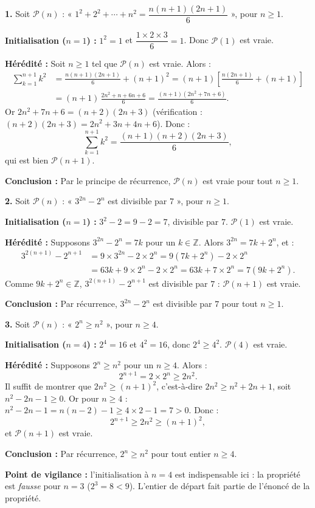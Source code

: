 \documentclass[11pt]{article}
\begin{document}
\begin{corrige}
\textbf{1.} Soit $\mathcal{P}(n)$ : « $1^2 + 2^2 + \cdots + n^2 = \dfrac{n(n+1)(2n+1)}{6}$ », pour $n \geq 1$.

\textbf{Initialisation ($n=1$) :} $1^2 = 1$ et $\dfrac{1 \times 2 \times 3}{6} = 1$. Donc $\mathcal{P}(1)$ est vraie.

\textbf{Hérédité :} Soit $n \geq 1$ tel que $\mathcal{P}(n)$ est vraie. Alors :
\begin{align*}
\sum_{k=1}^{n+1} k^2 &= \frac{n(n+1)(2n+1)}{6} + (n+1)^2 = (n+1)\left[\frac{n(2n+1)}{6} + (n+1)\right]\\
&= (n+1)\,\frac{2n^2 + n + 6n + 6}{6} = \frac{(n+1)(2n^2+7n+6)}{6}.
\end{align*}
Or $2n^2 + 7n + 6 = (n+2)(2n+3)$ (vérification : $(n+2)(2n+3) = 2n^2 + 3n + 4n + 6$). Donc :
\[ \sum_{k=1}^{n+1} k^2 = \frac{(n+1)(n+2)(2n+3)}{6}, \]
qui est bien $\mathcal{P}(n+1)$.

\textbf{Conclusion :} Par le principe de récurrence, $\mathcal{P}(n)$ est vraie pour tout $n \geq 1$.

\textbf{2.} Soit $\mathcal{P}(n)$ : « $3^{2n} - 2^n$ est divisible par $7$ », pour $n \geq 1$.

\textbf{Initialisation ($n=1$) :} $3^2 - 2 = 9 - 2 = 7$, divisible par $7$. $\mathcal{P}(1)$ est vraie.

\textbf{Hérédité :} Supposons $3^{2n} - 2^n = 7k$ pour un $k \in \mathbb{Z}$. Alors $3^{2n} = 7k + 2^n$, et :
\begin{align*}
3^{2(n+1)} - 2^{n+1} &= 9 \times 3^{2n} - 2 \times 2^n = 9(7k + 2^n) - 2 \times 2^n\\
&= 63k + 9 \times 2^n - 2 \times 2^n = 63k + 7 \times 2^n = 7(9k + 2^n).
\end{align*}
Comme $9k + 2^n \in \mathbb{Z}$, $3^{2(n+1)} - 2^{n+1}$ est divisible par $7$ : $\mathcal{P}(n+1)$ est vraie.

\textbf{Conclusion :} Par récurrence, $3^{2n} - 2^n$ est divisible par $7$ pour tout $n \geq 1$.

\textbf{3.} Soit $\mathcal{P}(n)$ : « $2^n \geq n^2$ », pour $n \geq 4$.

\textbf{Initialisation ($n=4$) :} $2^4 = 16$ et $4^2 = 16$, donc $2^4 \geq 4^2$. $\mathcal{P}(4)$ est vraie.

\textbf{Hérédité :} Supposons $2^n \geq n^2$ pour un $n \geq 4$. Alors :
\[ 2^{n+1} = 2 \times 2^n \geq 2n^2. \]
Il suffit de montrer que $2n^2 \geq (n+1)^2$, c'est-à-dire $2n^2 \geq n^2 + 2n + 1$, soit $n^2 - 2n - 1 \geq 0$. Or pour $n \geq 4$ : $n^2 - 2n - 1 = n(n-2) - 1 \geq 4 \times 2 - 1 = 7 > 0$. Donc :
\[ 2^{n+1} \geq 2n^2 \geq (n+1)^2, \]
et $\mathcal{P}(n+1)$ est vraie.

\textbf{Conclusion :} Par récurrence, $2^n \geq n^2$ pour tout entier $n \geq 4$.

\textbf{Point de vigilance :} l'initialisation à $n = 4$ est indispensable ici : la propriété est \emph{fausse} pour $n = 3$ ($2^3 = 8 < 9$). L'entier de départ fait partie de l'énoncé de la propriété.
\end{corrige}
\end{document}
